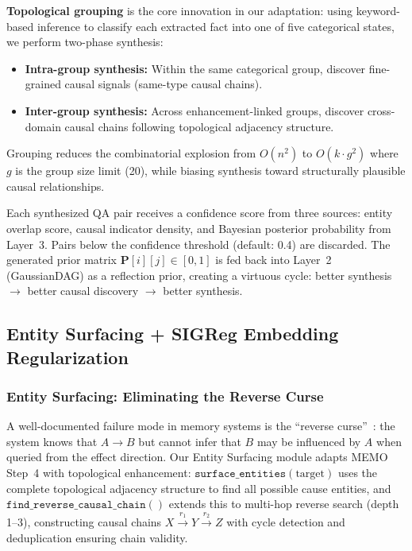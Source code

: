 \documentclass[11pt,a4paper]{article}
\begin{document}
\textbf{Topological grouping} is the core innovation in our adaptation: using keyword-based inference to classify each extracted fact into one of five categorical states, we perform two-phase synthesis:
\begin{itemize}[itemsep=0pt]
    \item \textbf{Intra-group synthesis:} Within the same categorical group, discover fine-grained causal signals (same-type causal chains).
    \item \textbf{Inter-group synthesis:} Across enhancement-linked groups, discover cross-domain causal chains following topological adjacency structure.
\end{itemize}

Grouping reduces the combinatorial explosion from \(O(n^2)\) to \(O(k \cdot g^2)\) where \(g\) is the group size limit (20), while biasing synthesis toward structurally plausible causal relationships.

Each synthesized QA pair receives a confidence score from three sources: entity overlap score, causal indicator density, and Bayesian posterior probability from Layer~3. Pairs below the confidence threshold (default: 0.4) are discarded. The generated prior matrix \(\mathbf{P}[i][j] \in [0, 1]\) is fed back into Layer~2 (GaussianDAG) as a reflection prior, creating a virtuous cycle: better synthesis \(\to\) better causal discovery \(\to\) better synthesis.

\subsection{Entity Surfacing + SIGReg Embedding Regularization}

\subsubsection{Entity Surfacing: Eliminating the Reverse Curse}

A well-documented failure mode in memory systems is the ``reverse curse''~\cite{berglund2023}: the system knows that \(A \to B\) but cannot infer that \(B\) may be influenced by \(A\) when queried from the effect direction. Our Entity Surfacing module adapts MEMO Step~4 with topological enhancement: \(\texttt{surface\_entities}(\text{target})\) uses the complete topological adjacency structure to find all possible cause entities, and \(\texttt{find\_reverse\_causal\_chain}()\) extends this to multi-hop reverse search (depth 1--3), constructing causal chains \(X \xrightarrow{r_1} Y \xrightarrow{r_2} Z\) with cycle detection and deduplication ensuring chain validity.
\end{document}
